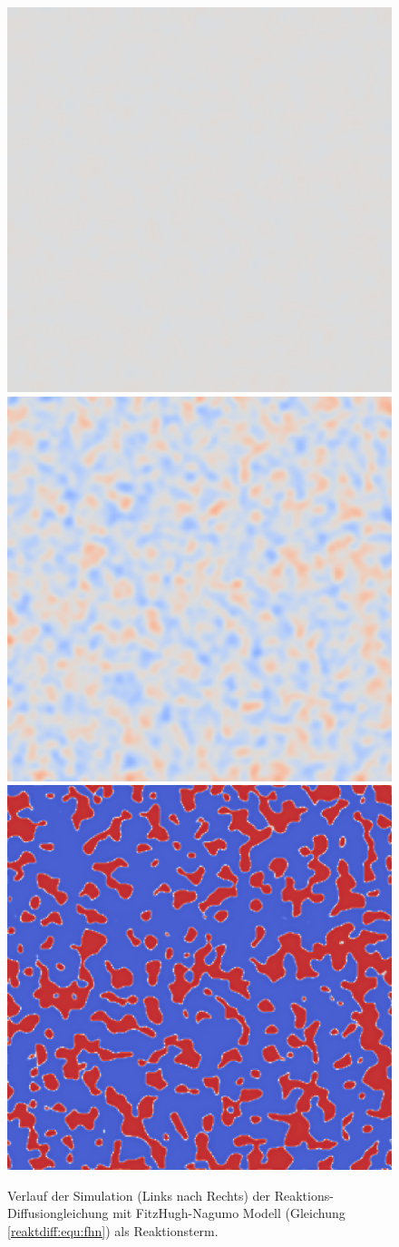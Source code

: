 \begin{figure}
    \centering
    \includegraphics[width=0.32\linewidth]{papers/reaktdiff/images/FitzHughNagumo/fhn_n1.png}
    \includegraphics[width=0.32\linewidth]{papers/reaktdiff/images/FitzHughNagumo/fhn_n300.png}
    \includegraphics[width=0.32\linewidth]{papers/reaktdiff/images/FitzHughNagumo/fhn_n999.png}
    \caption{Verlauf der Simulation (Links nach Rechts) der Reaktions-Diffusiongleichung mit FitzHugh-Nagumo Modell (Gleichung \eqref{reaktdiff:equ:fhn}) als Reaktionsterm.}
    \label{reaktdiff:fig:fhn}
\end{figure}